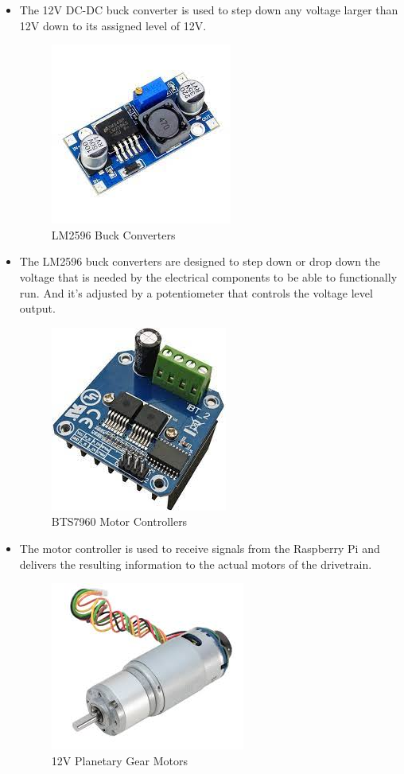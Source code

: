 \documentclass[a4paper, 10pt]{article}
\begin{document}
\begin{itemize}
		\item The 12V DC-DC buck converter is used to step down any voltage larger than 12V down to its assigned level of 12V.

		\begin{figure} [!h]
			\centering
			\includegraphics[scale=0.3]{Photos/LM2596 bucks}
			\caption{LM2596 Buck Converters}
		\end{figure}

		\item The LM2596 buck converters are designed to step down or drop down the voltage that is needed by the electrical components to be able to functionally run. And it's adjusted by a potentiometer that controls the voltage level output.

		\begin{figure} [!h]
			\centering
			\includegraphics[scale=0.25]{Photos/BTS7960 Motor Driver}
			\caption{BTS7960 Motor Controllers}
		\end{figure}

		\item The motor controller is used to receive signals from the Raspberry Pi and delivers the resulting information to the actual motors of the drivetrain.

		\begin{figure} [!h]
			\centering
			\includegraphics[scale=0.25]{Photos/Gear motor 12V planetary}
			\caption{12V Planetary Gear Motors}
		\end{figure}


\end{itemize}
\end{document}
